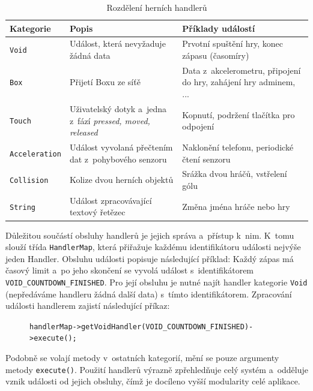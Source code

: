 \documentclass[thesis=B,czech,hidelinks]{FITthesis}[2012/06/26] %
\newcommand{\code}[1]{\texttt{#1}}
\begin{document}
\begin{table}[h]
\caption{Rozdělení herních handlerů}
\label{table:handlers}
\begin{tabularx}{\textwidth}{|X|X|X|}
\hline
\textbf{Kategorie} & \textbf{Popis} & \textbf{Příklady událostí} \\ \hline
\code{Void} & Událost, která nevyžaduje žádná data & Prvotní spuštění hry, konec zápasu (časomíry) \\ \hline
\code{Box} & Přijetí Boxu ze síťě & Data z~akcelerometru, připojení do hry, zahájení hry adminem, ... \\ \hline
\code{Touch} & Uživatelský dotyk a~jedna z~fází \textit{pressed, moved, released} & Kopnutí, podržení tlačítka pro odpojení \\ \hline
\code{Acceleration} & Událost vyvolaná přečtením dat z~pohybového senzoru & Naklonění telefonu, periodické čtení senzoru \\ \hline
\code{Collision} & Kolize dvou herních objektů & Srážka dvou hráčů, vstřelení gólu\\ \hline
\code{String} & Událost zpracovávající textový řetězec & Změna jména hráče nebo hry \\ \hline

\end{tabularx}
\end{table}

Důležitou součástí obsluhy handlerů je jejich správa a~přístup k~nim. K~tomu slouží třída \code{HandlerMap}, která přiřažuje každému identifikátoru události nejvýše jeden Handler. Obsluhu události popisuje následující příklad: Každý zápas má časový limit a~po jeho skončení se vyvolá událost s~identifikátorem \code{VOID\_COUNTDOWN\_FINISHED}. Pro její obsluhu je nutné najít handler kategorie \code{Void} (nepředáváme handleru žádná další data) s~tímto identifikátorem. Zpracování události handlerem zajistí následující příkaz: 

\begin{figure}[h!]
	\code{handlerMap->getVoidHandler(VOID\_COUNTDOWN\_FINISHED)->execute();}
\end{figure}

Podobně se volají metody v~ostatních kategorií, mění se pouze argumenty metody \code{execute()}. Použití handlerů výrazně zpřehledňuje celý systém a~odděluje vznik události od jejich obsluhy, čímž je docíleno vyšší modularity celé aplikace.
\end{document}
